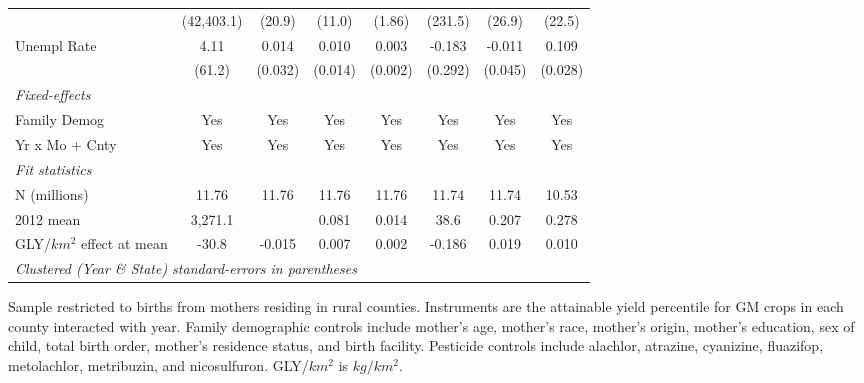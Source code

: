 \begin{tabular}{lccccccc}
                             & (42,403.1) & (20.9)  & (11.0)  & (1.86)      & (231.5)   & (26.9)  & (22.5)\\   
   Unempl Rate               & 4.11       & 0.014   & 0.010   & 0.003       & -0.183    & -0.011  & 0.109\\   
                             & (61.2)     & (0.032) & (0.014) & (0.002)     & (0.292)   & (0.045) & (0.028)\\   
   \midrule
   \emph{Fixed-effects}\\
   Family Demog              & Yes        & Yes     & Yes     & Yes         & Yes       & Yes     & Yes\\  
   Yr x Mo + Cnty            & Yes        & Yes     & Yes     & Yes         & Yes       & Yes     & Yes\\  
   \midrule
   \emph{Fit statistics}\\
   N (millions)              & 11.76      & 11.76   & 11.76   & 11.76       & 11.74     & 11.74   & 10.53\\  
   2012 mean                 & 3,271.1    &         & 0.081   & 0.014       & 38.6      & 0.207   & 0.278\\  
   GLY/$km^2$ effect at mean & -30.8      & -0.015  & 0.007   & 0.002       & -0.186    & 0.019   & 0.010\\  
   \midrule
   \multicolumn{8}{l}{\emph{Clustered (Year \& State) standard-errors in parentheses}}\\
\end{tabular}
 
\par \raggedright 
Sample restricted to births from mothers residing in rural counties. Instruments are the attainable yield percentile for GM crops in each county interacted with year. Family demographic controls include mother's age, mother's race, mother's origin, mother's education, sex of child, total birth order, mother's residence status, and birth facility. Pesticide controls include alachlor, atrazine, cyanizine, fluazifop, metolachlor, metribuzin, and nicosulfuron. GLY/$km^2$ is $kg/km^2$.
\par\endgroup

